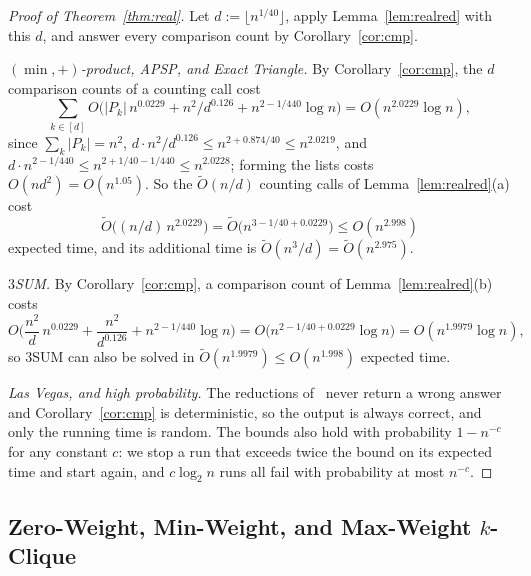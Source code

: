 \begin{proof}[Proof of Theorem~\ref{thm:real}]
Let $d:=\lfloor n^{1/40}\rfloor$, apply Lemma~\ref{lem:realred} with this $d$, and answer every comparison count by Corollary~\ref{cor:cmp}.

\emph{$(\min,+)$-product, APSP, and Exact Triangle.} By Corollary~\ref{cor:cmp}, the $d$ comparison counts of a counting call cost
\[
\sum_{k\in[d]}O\big(|P_k|\,n^{0.0229}+n^2/d^{0.126}+n^{2-1/440}\log n\big)=O(n^{2.0229}\log n),
\]
since $\sum_k|P_k|=n^2$, $d\cdot n^2/d^{0.126}\le n^{2+0.874/40}\le n^{2.0219}$, and $d\cdot n^{2-1/440}\le n^{2+1/40-1/440}\le n^{2.0228}$; forming the lists costs $O(nd^2)=O(n^{1.05})$. So the $\tilde{O}(n/d)$ counting calls of Lemma~\ref{lem:realred}(a) cost
\[
\tilde{O}\big((n/d)\,n^{2.0229}\big)=\tilde{O}\big(n^{3-1/40+0.0229}\big)\leq O(n^{2.998})
\]
expected time, and its additional time is $\tilde{O}(n^3/d)=\tilde{O}(n^{2.975})$. %


\emph{$3$SUM.} By Corollary~\ref{cor:cmp}, a comparison count of Lemma~\ref{lem:realred}(b) costs
\[
O\Big(\frac{n^2}{d}\,n^{0.0229}+\frac{n^2}{d^{0.126}}+n^{2-1/440}\log n\Big)=O\big(n^{2-1/40+0.0229}\log n\big)=O(n^{1.9979}\log n),
\]
so $3$SUM can also be solved in $\tilde{O}(n^{1.9979})\leq O(n^{1.998})$ expected time.

\emph{Las Vegas, and high probability.} The reductions of~\cite{CVX22} never return a wrong answer and Corollary~\ref{cor:cmp} is deterministic, so the output is always correct, and only the running time is random. The bounds also hold with probability $1-n^{-c}$ for any constant $c$: we stop a run that exceeds twice the bound on its expected time and start again, and $c\log_2n$ runs all fail with probability at most $n^{-c}$.
\end{proof}

\subsection{Zero-Weight, Min-Weight, and Max-Weight \texorpdfstring{$k$}{k}-Clique}\label{sec:kclique}


